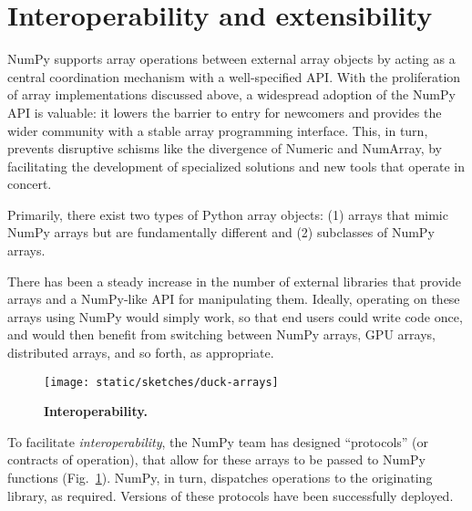 \section*{Interoperability and extensibility}

NumPy supports array operations between external array objects by
acting as a central coordination mechanism with a well-specified API.
With the proliferation of array implementations discussed above, a
widespread adoption of the NumPy API is valuable: it lowers the
barrier to entry for newcomers and provides the wider community with a
stable array programming interface. This, in turn, prevents disruptive
schisms like the divergence of Numeric and NumArray, by facilitating
the development of specialized solutions and new tools that operate in
concert.

Primarily, there
exist two types of Python array objects: (1) arrays that mimic NumPy arrays but are
fundamentally different and (2) subclasses of NumPy arrays.

There has been a steady increase in the number of external libraries that
provide arrays and a NumPy-like API for manipulating them.
Ideally, operating on these arrays using NumPy would simply work, so that end
users could write code once, and would then benefit from switching between
NumPy arrays, GPU arrays, distributed arrays, and so forth, as appropriate.

\begin{figure}
  \centering
  \texttt{[image: static/sketches/duck-arrays]}
  \caption{\textbf{Interoperability.} }\label{fig:duck-arrays}
\end{figure}


To facilitate \emph{interoperability}, the NumPy team has designed
``protocols'' (or contracts of operation), that allow for these arrays to be
passed to NumPy functions (Fig.~\ref{fig:duck-arrays}).
NumPy, in turn, dispatches operations to the originating library, as required.
Versions of these protocols have been successfully deployed.


